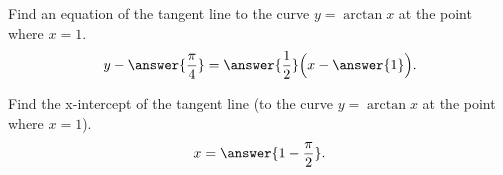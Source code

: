 \documentclass{ximera}
\author{Nela Lakos }
\begin{document}
\begin{exercise}

Find an equation of the tangent line to the curve $y=\arctan{x}$ at the point where $x=1$. 
\[
y-\answer{\frac{\pi}{4}} = \answer{\frac{1}{2}}\Bigl(x-\answer{1}\Bigr).
\]

\end{exercise}
\begin{exercise}

Find the x-intercept of the tangent line (to the curve $y=\arctan{x}$ at the point where $x=1$). 
\[
x = \answer{1-\frac{\pi}{2}}.
\]
\end{exercise}
\end{document}
